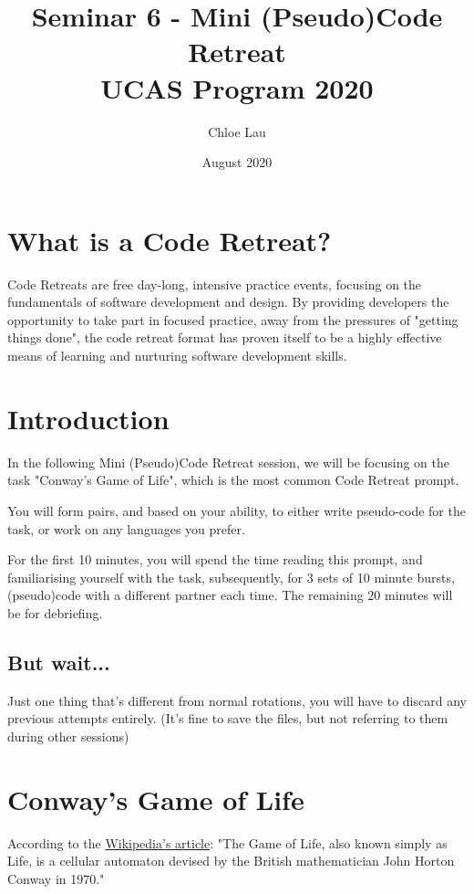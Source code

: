 \documentclass[12pt]{article}
\title{\vspace{-2cm} \textbf{Seminar 6 - Mini (Pseudo)Code Retreat} \\ UCAS Program 2020}
\author{Chloe Lau}
\date{August 2020}
\begin{document}
\setlength{\parindent}{4ex}
\setlength{\parskip}{1em}

\maketitle

\section{What is a Code Retreat?}

Code Retreats are free day-long, intensive practice events, focusing on the fundamentals of software development and design. By providing developers the opportunity to take part in focused practice, away from the pressures of "getting things done", the code retreat format has proven itself to be a highly effective means of learning and nurturing software development skills.

\section{Introduction}
In the following Mini (Pseudo)Code Retreat session, we will be focusing on the task "Conway's Game of Life", which is the most common Code Retreat prompt.

You will form pairs, and based on your ability, to either write pseudo-code for the task, or work on any languages you prefer. 

For the first 10 minutes, you will spend the time reading this prompt, and familiarising yourself with the task, subsequently, for 3 sets of 10 minute bursts, (pseudo)code with a different partner each time. The remaining 20 minutes will be for debriefing.

\subsection{But wait...}
Just one thing that's different from normal rotations, you will have to discard any previous attempts entirely. (It's fine to save the files, but not referring to them during other sessions)

\newpage
\section{Conway's Game of Life}
According to the \href{https://en.wikipedia.org/wiki/Conway%27s_Game_of_Life}{Wikipedia's article}: "The Game of Life, also known simply as Life, is a cellular automaton devised by the British mathematician John Horton Conway in 1970."
\end{document}
